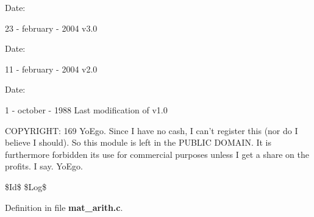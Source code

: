 \begin{Desc}
\item[Date: ]\par
23 - february - 2004 v3.0\end{Desc}
\begin{Desc}
\item[Date: ]\par
11 - february - 2004 v2.0\end{Desc}
\begin{Desc}
\item[Date: ]\par
1 - october - 1988 Last modification of v1.0\end{Desc}
COPYRIGHT: 169 Yo\-Ego. Since I have no cash, I can't register this (nor do I believe I should). So this module is left in the PUBLIC DOMAIN. It is furthermore forbidden its use for commercial purposes unless I get a share on the profits. I say. Yo\-Ego.

\$Id\$ \$Log\$



Definition in file {\bf mat\_\-arith.c}.